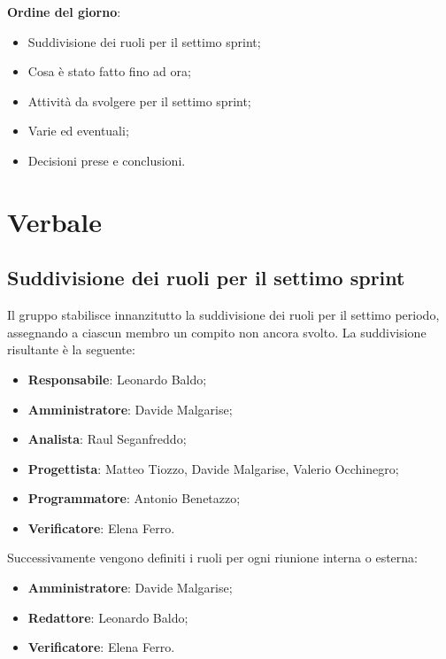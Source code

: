 \documentclass[italian,12pt]{article}
\begin{document}
\raggedright
\textbf{Ordine del giorno}:
\begin{itemize}
	\item Suddivisione dei ruoli per il settimo sprint;
	\item Cosa è stato fatto fino ad ora;
	\item Attività da svolgere per il settimo sprint;
	\item Varie ed eventuali;
	\item Decisioni prese e conclusioni.
\end{itemize}

\newpage

\section{Verbale}
\subsection{Suddivisione dei ruoli per il settimo sprint}
Il gruppo stabilisce innanzitutto la suddivisione dei ruoli per il settimo periodo, assegnando a ciascun membro un compito non ancora svolto. La suddivisione risultante è la seguente:
\begin{itemize}
	\item \textbf{Responsabile}: Leonardo Baldo;
	\item \textbf{Amministratore}: Davide Malgarise;
	\item \textbf{Analista}: Raul Seganfreddo;
	\item \textbf{Progettista}: Matteo Tiozzo, Davide Malgarise, Valerio Occhinegro;
	\item \textbf{Programmatore}: Antonio Benetazzo;
	\item \textbf{Verificatore}: Elena Ferro.
\end{itemize}
Successivamente vengono definiti i ruoli per ogni riunione interna o esterna:
\begin{itemize}
	\item \textbf{Amministratore}: Davide Malgarise;
	\item \textbf{Redattore}: Leonardo Baldo;
	\item \textbf{Verificatore}: Elena Ferro.
\end{itemize}
\end{document}
